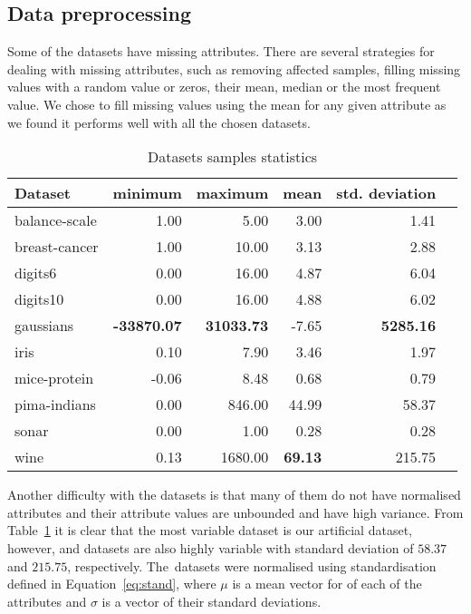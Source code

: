 \documentclass[12pt,a4paper]{report}
\begin{document}
\subsection{Data preprocessing} \label{chap:exp:preprocessing}
Some of the datasets have missing attributes. There are several strategies for dealing with missing attributes, such as removing affected samples, filling missing values with a random value or zeros, their mean, median or the most frequent value. We chose to fill missing values using the mean for any given attribute as we found it performs well with all the chosen datasets.

\begin{table}[ht] \centering
\begin{tabular}{lrrrrr}
\hline
Dataset & minimum & maximum & mean & std. deviation \\
\hline
balance-scale           & 1.00  & 5.00    & 3.00  & 1.41 \\
breast-cancer           & 1.00  & 10.00   & 3.13  & 2.88 \\
digits6                 & 0.00  & 16.00   & 4.87  & 6.04 \\
digits10                & 0.00  & 16.00   & 4.88  & 6.02 \\
gaussians               & \textbf{-33870.07} & \textbf{31033.73} & -7.65 & \textbf{5285.16} \\
iris                    & 0.10  & 7.90    & 3.46  & 1.97 \\
mice-protein            & -0.06 & 8.48    & 0.68  & 0.79 \\
pima-indians            & 0.00  & 846.00  & 44.99 & 58.37 \\
sonar                   & 0.00  & 1.00    & 0.28  & 0.28 \\
wine                    & 0.13  & 1680.00 & \textbf{69.13} & 215.75 \\
\hline
\end{tabular}
\caption{Datasets samples statistics} \label{tab:datasets-samples}
\end{table}

Another difficulty with the datasets is that many of them do not have normalised attributes and their attribute values are unbounded and have high variance. From Table~\ref{tab:datasets-samples} it is clear that the most variable dataset is our artificial  dataset, however,  and  datasets are also highly variable with  standard deviation of $58.37$ and $215.75$, respectively. The~datasets were normalised using standardisation defined in Equation~\ref{eq:stand}, where $\mu$ is a mean vector for of each of the attributes and $\sigma$ is a vector of their standard deviations.
\end{document}
